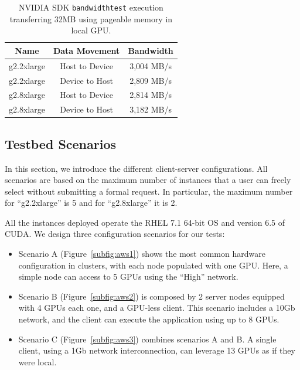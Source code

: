 \documentclass[a4paper,twoside]{article}
\begin{document}
\begin{table}[htb]
\renewcommand{\arraystretch}{1.3}
\caption{NVIDIA SDK {\tt bandwidthtest} execution transferring 32MB using pageable memory in local GPU.}
\label{table:bwt}
\tabcolsep=0.09cm
\begin{center}\begin{tabular}{ccc}
Name &  Data Movement & Bandwidth \\ \hline \hline
g2.2xlarge & Host to Device & 3,004 MB/s \\ \hline
g2.2xlarge & Device to Host & 2,809 MB/s\\ \hline
g2.8xlarge & Host to Device & 2,814 MB/s\\ \hline
g2.8xlarge & Device to Host & 3,182 MB/s\\ \hline
\end{tabular}\end{center}\end{table}

\subsection{Testbed Scenarios}
In this section, we introduce the different client-server configurations. 
All scenarios are based on the maximum number of instances 
that a user can freely select without submitting a formal request. 
In particular, the maximum number for ``g2.2xlarge'' is 5 and for ``g2.8xlarge'' it is 2.

All the instances deployed operate the RHEL 7.1 64-bit OS and version 6.5 of CUDA. 
We design three configuration scenarios for our tests:

\begin{itemize}
\item Scenario A (Figure~\ref{subfig:aws1}) shows the most common 
 hardware configuration in clusters, with each node  
populated with one GPU. Here, a simple node can access to 5 GPUs 
using the ``High'' network. 

\item Scenario B (Figure~\ref{subfig:aws2}) is composed by 2 server nodes equipped 
with 4 GPUs each one, and a GPU-less client. This scenario includes 
a 10Gb network, and the client can execute the application using up to 8 GPUs.

\item Scenario C (Figure~\ref{subfig:aws3}) combines scenarios A and B. A 
single client, using a 1Gb network interconnection, can leverage 13 GPUs as if they were local.
\end{itemize}
\end{document}
